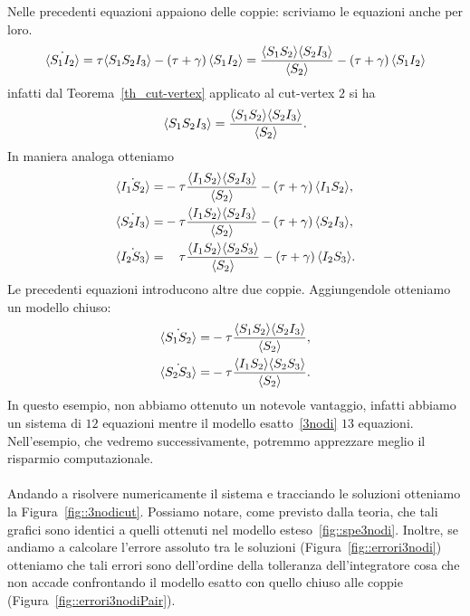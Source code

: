 Nelle precedenti equazioni appaiono delle coppie: scriviamo le equazioni anche per loro.\\
$$\dot{\langle S_1I_2 \rangle}=\tau
\langle S_1S_2I_3 \rangle - \left(  \tau + \gamma \right)\langle S_1 I_2 \rangle = \frac{
\langle S_1S_2 \rangle\langle S_2I_3 \rangle}{\langle S_2 \rangle} - \left(  \tau + \gamma \right)\langle S_1 I_2 \rangle$$ 
infatti  dal Teorema~\ref{th_cut-vertex} applicato al cut-vertex $2$ si ha  
$$ \langle S_1S_2I_3 \rangle = \frac{ \langle S_1S_2 \rangle\langle S_2I_3 \rangle}{\langle S_2 \rangle}.$$ 
In maniera analoga otteniamo 
\begin{equation*}
\begin{aligned}
\dot{\angol{I_1S_2}}=&-\tau\frac{\angol{I_1S_2}\angol{S_2I_3}}{\angol{S_2}} - \tonde{ \tau + \gamma}\angol{I_1 S_2},
\\
\dot{\angol{S_2I_3}}=&-\tau\frac{\angol{I_1S_2}\angol{S_2I_3}}{\angol{S_2}} - \tonde{ \tau + \gamma}\angol{S_2 I_3},
\\
\dot{\angol{I_2S_3}}=&\spa\tau\frac{\angol{I_1S_2}\angol{S_2S_3}}{\angol{S_2}} - \tonde{ \tau + \gamma}\angol{I_2 S_3}.
\end{aligned}
\end{equation*}
Le precedenti equazioni introducono altre due coppie. Aggiungendole otteniamo un modello chiuso: 
\begin{equation*}
\begin{aligned}
\dot{\langle S_1S_2 \rangle} = &- \tau\frac{\langle S_1S_2 \rangle\langle S_2I_3 \rangle}{\langle S_2 \rangle},\\
\dot{\langle S_2S_3 \rangle}= & -\tau \frac{\langle  I_1 S_2 \rangle\langle S_2S_3 \rangle}{\langle S_2 \rangle}.
	\end{aligned}	
\end{equation*}
In questo esempio, non abbiamo ottenuto un notevole vantaggio, infatti abbiamo un sistema di $12$ equazioni mentre il  modello esatto~\eqref{3nodi} $13$ equazioni. Nell'esempio, che vedremo successivamente, potremmo apprezzare meglio il risparmio computazionale.\\ \\
Andando a risolvere numericamente il sistema e tracciando le soluzioni otteniamo la  Figura~\ref{fig::3nodicut}. Possiamo notare, come previsto dalla teoria, che  tali grafici sono identici a quelli ottenuti nel modello esteso~\ref{fig::spe3nodi}. Inoltre, se andiamo a calcolare l'errore assoluto tra le soluzioni (Figura~\ref{fig::errori3nodi}) otteniamo che tali errori sono dell'ordine della tolleranza dell'integratore cosa che non accade confrontando il modello esatto con quello chiuso alle coppie (Figura~\ref{fig::errori3nodiPair}).
